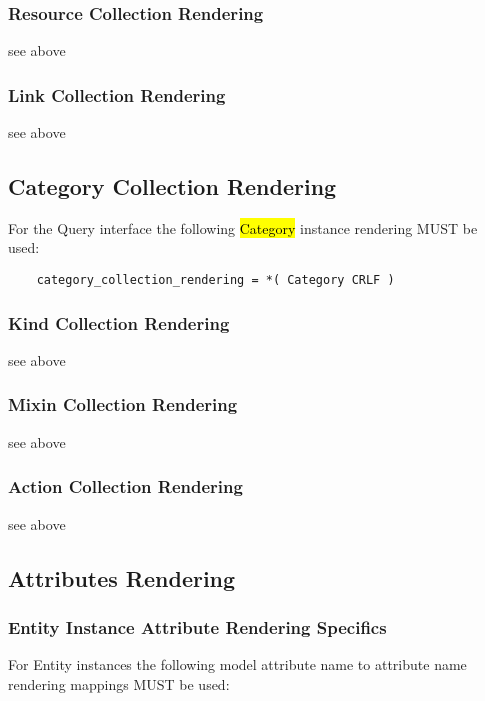 \documentclass[10pt,a4paper]{article}
\begin{document}
\subsubsection{Resource Collection Rendering}

see above

\subsubsection{Link Collection Rendering}

see above

\subsection{Category Collection Rendering}

For the Query interface the following \hl{Category} instance rendering MUST be used:

\begin{verbatim}
	category_collection_rendering = *( Category CRLF ) 
\end{verbatim}

\subsubsection{Kind Collection Rendering}

see above

\subsubsection{Mixin Collection Rendering}

see above

\subsubsection{Action Collection Rendering}

see above

\subsection{Attributes Rendering}

\subsubsection{Entity Instance Attribute Rendering Specifics}

For Entity instances the following model attribute name to attribute name rendering mappings MUST be used:
\end{document}
